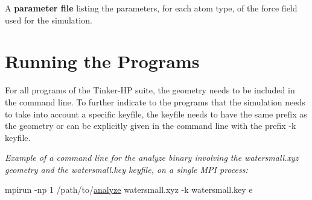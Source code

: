 \begin{DoxyItemize}
\item A {\bfseries parameter file} listing the parameters, for each atom type, of the force field used for the simulation.
\end{DoxyItemize}\hypertarget{md_binaries_doxygen_running_the_programs}{}\section{Running the Programs}\label{md_binaries_doxygen_running_the_programs}
For all programs of the Tinker-\/\-H\-P suite, the geometry needs to be included in the command line. To further indicate to the programs that the simulation needs to take into account a specific keyfile, the keyfile needs to have the same prefix as the geometry or can be explicitly given in the command line with the prefix {\ttfamily -\/k keyfile}.

{\itshape Example of a command line for the analyze binary involving the {\ttfamily watersmall.\-xyz} geometry and the {\ttfamily watersmall.\-key} keyfile, on a single M\-P\-I process\-:}


\begin{DoxyCode}
mpirun -np 1 /path/to/\hyperlink{analyze_8f90_ad0571e0cf34d424af56a4981e316f8eb}{analyze} watersmall.xyz -k watersmall.key e
\end{DoxyCode}


